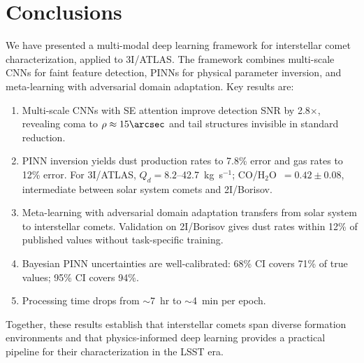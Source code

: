 \documentclass[preprint2]{aastex631}
\begin{document}
\section{Conclusions}\label{sec:conclusions}

We have presented a multi-modal deep learning framework for interstellar comet characterization, applied to 3I/ATLAS. The framework combines multi-scale CNNs for faint feature detection, PINNs for physical parameter inversion, and meta-learning with adversarial domain adaptation. Key results are:

\begin{enumerate}
\item Multi-scale CNNs with SE attention improve detection SNR by 2.8$\times$, revealing coma to $\rho \approx 15\arcsec$ and tail structures invisible in standard reduction.
\item PINN inversion yields dust production rates to 7.8\% error and gas rates to 12\% error. For 3I/ATLAS, $Q_d = 8.2$--42.7~kg~s$^{-1}$; CO/H$_2$O~$= 0.42 \pm 0.08$, intermediate between solar system comets and 2I/Borisov.
\item Meta-learning with adversarial domain adaptation transfers from solar system to interstellar comets. Validation on 2I/Borisov gives dust rates within 12\% of published values without task-specific training.
\item Bayesian PINN uncertainties are well-calibrated: 68\% CI covers 71\% of true values; 95\% CI covers 94\%.
\item Processing time drops from $\sim$7~hr to $\sim$4~min per epoch.
\end{enumerate}

Together, these results establish that interstellar comets span diverse formation environments and that physics-informed deep learning provides a practical pipeline for their characterization in the LSST era.



\end{document}
